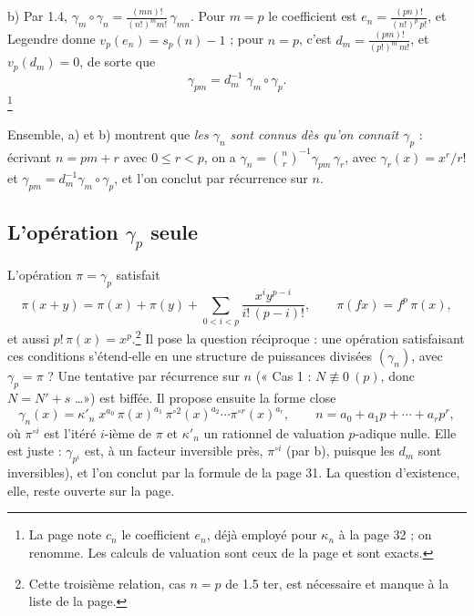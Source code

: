 \documentclass[11pt,a4paper]{article}
\begin{document}
b) Par 1.4, $\gamma_m \circ \gamma_n = \frac{(mn)!}{(n!)^{m} m!}\,\gamma_{mn}$.
Pour $m = p$ le coefficient est $e_n = \frac{(pn)!}{(n!)^{p}\,p!}$, et
Legendre donne $v_p(e_n) = s_p(n) - 1$ ; pour $n = p$, c'est $d_m =
\frac{(pm)!}{(p!)^{m}\,m!}$, et $v_p(d_m) = 0$, de sorte que
\[
\gamma_{pm} = d_m^{-1}\; \gamma_m \circ \gamma_p .
\]
\footnote{La page note $c_n$ le coefficient $e_n$, déjà employé pour
$\kappa_n$ à la page 32 ; on renomme. Les calculs de valuation sont ceux de
la page et sont exacts.}

Ensemble, a) et b) montrent que \emph{les $\gamma_n$ sont connus dès qu'on
connaît $\gamma_p$} : écrivant $n = pm + r$ avec $0 \leqslant r < p$, on a
$\gamma_n = \binom{n}{r}^{-1}\gamma_{pm}\,\gamma_r$, avec $\gamma_r(x) =
x^{r}/r!$ et $\gamma_{pm} = d_m^{-1}\gamma_m \circ \gamma_p$, et l'on conclut
par récurrence sur $n$.

\subsection*{L'opération $\gamma_p$ seule}

L'opération $\pi = \gamma_p$ satisfait
\[
\pi(x+y) = \pi(x) + \pi(y) + \sum_{0 < i < p} \frac{x^{i}y^{p-i}}{i!\,(p-i)!},
\qquad \pi(fx) = f^{p}\,\pi(x),
\]
et aussi $p!\,\pi(x) = x^{p}$.\footnote{Cette troisième relation, cas
$n = p$ de 1.5 ter, est nécessaire et manque à la liste de la page.} Il
pose la question réciproque : une opération satisfaisant ces conditions
s'étend-elle en une structure de puissances divisées $(\gamma_n)$, avec
$\gamma_p = \pi$ ? Une tentative par récurrence sur $n$ (« Cas 1 : $N
\not\equiv 0\ (p)$, donc $N = N' + s$ \ldots ») est biffée. Il propose
ensuite la forme close
\[
\gamma_n(x) = \kappa'_n\; x^{a_0}\,\pi(x)^{a_1}\,\pi^{\circ 2}(x)^{a_2}\cdots
\pi^{\circ r}(x)^{a_r}, \qquad n = a_0 + a_1 p + \cdots + a_r p^{r},
\]
où $\pi^{\circ i}$ est l'itéré $i$-ième de $\pi$ et $\kappa'_n$ un rationnel
de valuation $p$-adique nulle. Elle est juste : $\gamma_{p^{i}}$ est, à un
facteur inversible près, $\pi^{\circ i}$ (par b), puisque les $d_m$ sont
inversibles), et l'on conclut par la formule de la page 31. La question
d'existence, elle, reste ouverte sur la page.
\end{document}
